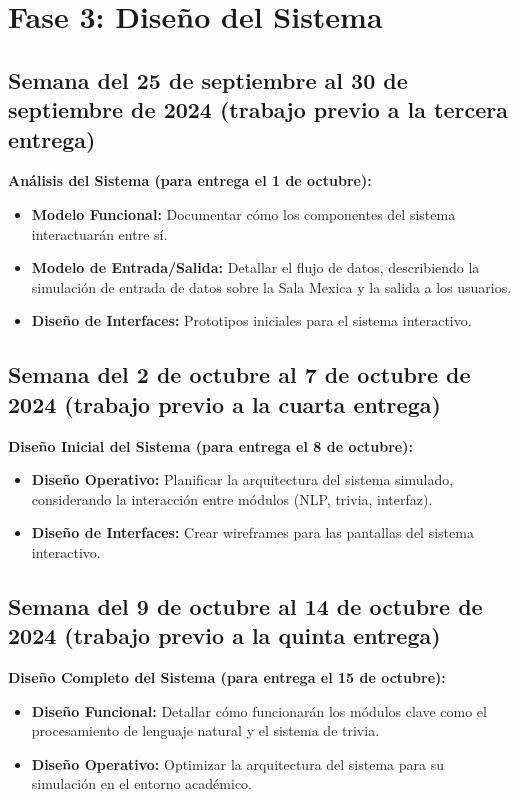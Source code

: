 \documentclass{report}
\begin{document}
    \section*{Fase 3: Diseño del Sistema}
    \subsection*{Semana del 25 de septiembre al 30 de septiembre de 2024 (trabajo previo a la tercera entrega)}
    \textbf{Análisis del Sistema (para entrega el 1 de octubre):}
    \begin{itemize}
        \item \textbf{Modelo Funcional:} Documentar cómo los componentes del sistema interactuarán entre sí.
        \item \textbf{Modelo de Entrada/Salida:} Detallar el flujo de datos, describiendo la simulación de entrada de datos sobre la Sala Mexica y la salida a los usuarios.
        \item \textbf{Diseño de Interfaces:} Prototipos iniciales para el sistema interactivo.
    \end{itemize}

    \subsection*{Semana del 2 de octubre al 7 de octubre de 2024 (trabajo previo a la cuarta entrega)}
    \textbf{Diseño Inicial del Sistema (para entrega el 8 de octubre):}
    \begin{itemize}
        \item \textbf{Diseño Operativo:} Planificar la arquitectura del sistema simulado, considerando la interacción entre módulos (NLP, trivia, interfaz).
        \item \textbf{Diseño de Interfaces:} Crear wireframes para las pantallas del sistema interactivo.
    \end{itemize}

    \subsection*{Semana del 9 de octubre al 14 de octubre de 2024 (trabajo previo a la quinta entrega)}
    \textbf{Diseño Completo del Sistema (para entrega el 15 de octubre):}
    \begin{itemize}
        \item \textbf{Diseño Funcional:} Detallar cómo funcionarán los módulos clave como el procesamiento de lenguaje natural y el sistema de trivia.
        \item \textbf{Diseño Operativo:} Optimizar la arquitectura del sistema para su simulación en el entorno académico.
    \end{itemize}
\end{document}
